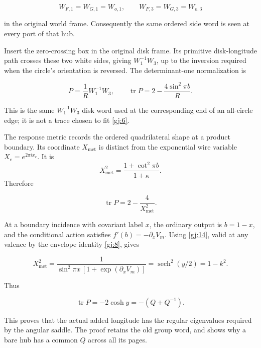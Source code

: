 \begin{equation}\label{gj:16}
W_{F,1}=W_{G,1}=W_{o,1},\qquad
 W_{F,3}=W_{G,3}=W_{o,3}
\end{equation}

in the original world frame. Consequently the same ordered side word is seen at every port of that hub.

Insert the zero-crossing box in the original disk frame. Its primitive disk-longitude path crosses these two white sides, giving \(W_1^{-1}W_3\), up to the inversion required when the circle's orientation is reversed. The determinant-one normalization is

\begin{equation}\label{gj:17}
P=\frac1R W_1^{-1}W_3,\qquad
 \operatorname{tr}P
   =2-\frac{4\sin^2\pi b}{R}.
\end{equation}

This is the same \(W_1^{-1}W_3\) disk word used at the corresponding end of an all-circle edge; it is not a trace chosen to fit \eqref{gj:6}.

The response metric records the ordered quadrilateral shape at a
product boundary. Its coordinate \(X_{\mathrm{met}}\) is distinct
from the exponential wire variable \(X_e=e^{2\pi ix_e}\). It is
\[
 X_{\mathrm{met}}^2=\frac{1+\cot^2\pi b}{1+\kappa}.
\]
Therefore

\begin{equation}\label{gj:18}
\operatorname{tr}P=2-\frac4{X_{\mathrm{met}}^2}.
\end{equation}

At a boundary incidence with covariant label \(x\), the ordinary output is \(b=1-x\), and the conditional action satisfies \(f'(b)=-\partial_xV_m\). Using \eqref{gj:14}, valid at any valence by the envelope identity \eqref{gj:8}, gives

\begin{equation}\label{gj:19}
X_{\mathrm{met}}^2
 =\frac1{\sin^2\pi x\,[1+\exp(\partial_xV_m)]}
 =\operatorname{sech}^2(y/2)=1-k^2.
\end{equation}

Thus

\begin{equation}\label{gj:20}
\operatorname{tr}P=-2\cosh y=-(Q+Q^{-1}).
\end{equation}

This proves that the actual added longitude has the regular eigenvalues required by the angular saddle. The proof retains the old group word, and shows why a bare hub has a common \(Q\) across all its pages.

